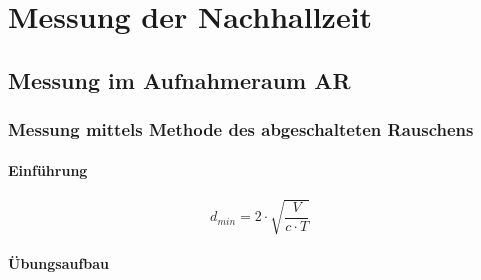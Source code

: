 \documentclass[11pt]{report}
\begin{document}


%

\newpage
\tableofcontents  

%




\listoffigures 


\pagestyle{headings}


\chapter{Messung der Nachhallzeit}
\section{Messung im Aufnahmeraum AR}
\subsection{Messung mittels Methode des abgeschalteten Rauschens}
\subsubsection{Einf\"uhrung}
\begin{equation}
d_{min}=2\cdot \sqrt{\frac{V}{c\cdot T}}
\end{equation}
\subsubsection{Übungsaufbau}
\end{document}
